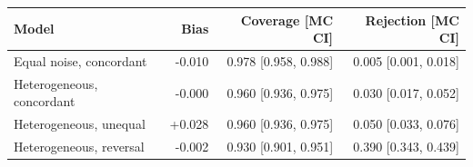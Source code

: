 \begin{tabular}{lrrr}
\toprule
Model & Bias & Coverage [MC CI] & Rejection [MC CI] \\
\midrule
Equal noise, concordant & -0.010 & 0.978 [0.958, 0.988] & 0.005 [0.001, 0.018] \\
Heterogeneous, concordant & -0.000 & 0.960 [0.936, 0.975] & 0.030 [0.017, 0.052] \\
Heterogeneous, unequal & +0.028 & 0.960 [0.936, 0.975] & 0.050 [0.033, 0.076] \\
Heterogeneous, reversal & -0.002 & 0.930 [0.901, 0.951] & 0.390 [0.343, 0.439] \\
\bottomrule
\end{tabular}
